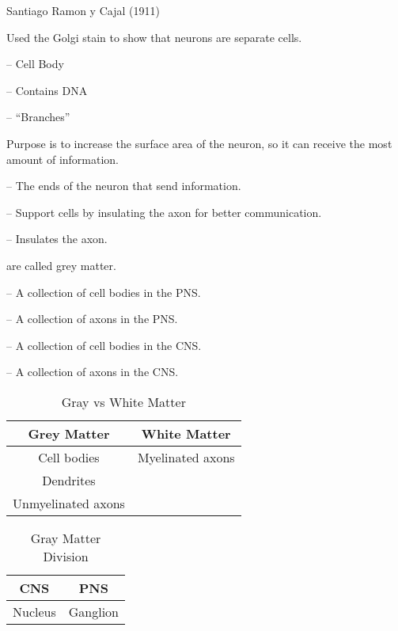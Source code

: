 \begin{coloredlist}
    \item Santiago Ramon y Cajal (1911)
    \begin{coloredlist}
        \item Used the Golgi stain to show that neurons are separate cells.
    \end{coloredlist}
    \item {} -- Cell Body
    \item {} -- Contains DNA
    \item {} -- ``Branches''
    \begin{coloredlist}
        \item Purpose is to increase the surface area of the neuron, so it can receive the most amount of information.
    \end{coloredlist}
    \item {} -- The ends of the neuron that send information.
    \item {} -- Support cells by insulating the axon for better communication.
    \item {} -- Insulates the axon.
    \item {} are called grey matter.
    \item {} -- A collection of cell bodies in the PNS.
    \item {} -- A collection of axons in the PNS.
    \item {} -- A collection of cell bodies in the CNS.
    \item {} -- A collection of axons in the CNS.
\end{coloredlist}

\begin{table}[htbp]
    \centering
    \begin{tabular}{cc}
        \toprule
        \textbf{Grey Matter} & \textbf{White Matter} \\ \midrule
        Cell bodies & Myelinated axons \\
        Dendrites & \\
        Unmyelinated axons & \\
        \bottomrule
    \end{tabular}
    \caption{Gray vs White Matter}\label{tab:}
\end{table}

\begin{table}[htbp]
    \centering
    \begin{tabular}{cc}
        \toprule
        \textbf{CNS} & \textbf{PNS} \\ \midrule
        Nucleus & Ganglion \\
        \bottomrule
    \end{tabular}
    \caption{Gray Matter Division}\label{tab:}
\end{table}

